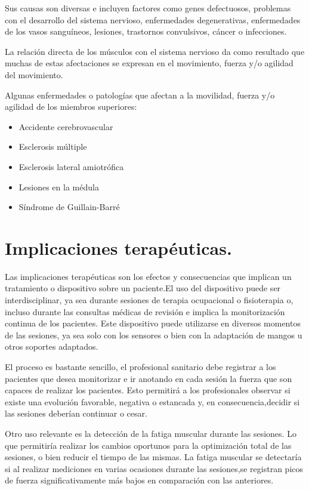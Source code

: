 Sus causas son diversas e incluyen factores como genes defectuosos, problemas con el desarrollo del sistema nervioso, enfermedades degenerativas, enfermedades de los vasos sanguíneos, lesiones, trastornos convulsivos, cáncer o infecciones. \cite{enfermedades_neurológicas}

La relación directa de los músculos con el sistema nervioso da como resultado que muchas de estas afectaciones se expresan en el movimiento, fuerza y/o agilidad del movimiento. 

Algunas enfermedades o patologías que afectan a la movilidad, fuerza y/o agilidad de los miembros superiores: 
\begin{itemize}
    \item Accidente cerebrovascular
    \item Esclerosis múltiple
    \item Esclerosis lateral amiotrófica
    \item Lesiones en la médula
    \item Síndrome de Guillain-Barré
\end{itemize}

\section{Implicaciones terapéuticas.}
Las implicaciones terapéuticas son los efectos y consecuencias que implican un tratamiento o dispositivo sobre un paciente.El uso del dispositivo puede ser interdisciplinar, ya sea durante sesiones de terapia ocupacional o fisioterapia o, incluso durante las consultas médicas de revisión e implica la monitorización continua de los pacientes. Este dispositivo puede utilizarse en diversos momentos de las sesiones, ya sea solo con los sensores o bien con la adaptación de mangos u otros soportes adaptados.

El proceso es bastante sencillo, el profesional sanitario debe registrar a los pacientes que desea monitorizar e ir anotando en cada sesión la fuerza que son capaces de realizar los pacientes. Esto permitirá a los profesionales observar si existe una evolución favorable, negativa o estancada y, en consecuencia,decidir si las sesiones deberían continuar o cesar. 

Otro uso relevante es la detección de la fatiga muscular durante las sesiones. Lo que permitiría realizar los cambios oportunos para la optimización total de las sesiones, o bien reducir el tiempo de las mismas. La fatiga muscular se detectaría si al realizar mediciones en varias ocasiones durante las sesiones,se registran picos de fuerza significativamente más bajos en comparación con las anteriores.

